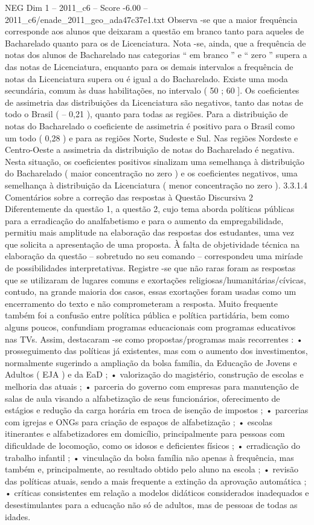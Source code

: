 \begin{textsample}{NEG Dim 1 – 2011\_c6 – Score -6.00 – 2011\_c6/enade\_2011\_geo\_ada47c37e1.txt}
Observa -se que a maior frequência corresponde aos alunos que deixaram a questão em branco tanto para aqueles de Bacharelado quanto para os de Licenciatura.
Nota -se, ainda, que a frequência de notas dos alunos de Bacharelado nas categorias “ em branco ” e “ zero ” supera a das notas de Licenciatura, enquanto para os demais intervalos a frequência de notas da Licenciatura supera ou é igual a do Bacharelado.
Existe uma moda secundária, comum às duas habilitações, no intervalo ( 50 ; 60 ].
Os coeficientes de assimetria das distribuições da Licenciatura são negativos, tanto das notas de todo o Brasil ( – 0,21 ), quanto para todas as regiões.
Para a distribuição de notas do Bacharelado o coeficiente de assimetria é positivo para o Brasil como um todo ( 0,28 ) e para as regiões Norte, Sudeste e Sul.
Nas regiões Nordeste e Centro-Oeste a assimetria da distribuição de notas do Bacharelado é negativa.
Nesta situação, os coeficientes positivos sinalizam uma semelhança à distribuição do Bacharelado ( maior concentração no zero ) e os coeficientes negativos, uma semelhança à distribuição da Licenciatura ( menor concentração no zero ). 3.3.1.4 Comentários sobre a correção das respostas à Questão Discursiva 2 Diferentemente da questão 1, a questão 2, cujo tema aborda políticas públicas para a erradicação do analfabetismo e para o aumento da empregabilidade, permitiu mais amplitude na elaboração das respostas dos estudantes, uma vez que solicita a apresentação de uma proposta.
À falta de objetividade técnica na elaboração da questão – sobretudo no seu comando – correspondeu uma miríade de possibilidades interpretativas.
Registre -se que não raras foram as respostas que se utilizaram de lugares comuns e exortações religiosas/humanitárias/cívicas, contudo, na grande maioria dos casos, essas exortações foram usadas como um encerramento do texto e não comprometeram a resposta.
Muito frequente também foi a confusão entre política pública e política partidária, bem como alguns poucos, confundiam programas educacionais com programas educativos nas TVs.
Assim, destacaram -se como propostas/programas mais recorrentes : • prosseguimento das políticas já existentes, mas com o aumento dos investimentos, normalmente sugerindo a ampliação da bolsa família, da Educação de Jovens e Adultos ( EJA ) e da EaD ; • valorização do magistério, construção de escolas e melhoria das atuais ; • parceria do governo com empresas para manutenção de salas de aula visando a alfabetização de seus funcionários, oferecimento de estágios e redução da carga horária em troca de isenção de impostos ; • parcerias com igrejas e ONGs para criação de espaços de alfabetização ; • escolas itinerantes e alfabetizadores em domicílio, principalmente para pessoas com dificuldade de locomoção, como os idosos e deficientes físicos ; • erradicação do trabalho infantil ; • vinculação da bolsa família não apenas à frequência, mas também e, principalmente, ao resultado obtido pelo aluno na escola ; • revisão das políticas atuais, sendo a mais frequente a extinção da aprovação automática ; • críticas consistentes em relação a modelos didáticos considerados inadequados e desestimulantes para a educação não só de adultos, mas de pessoas de todas as idades.

\end{textsample}
